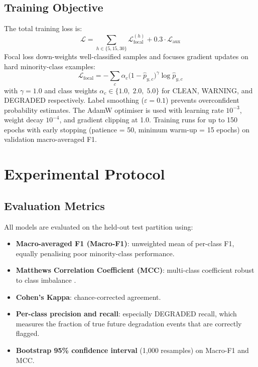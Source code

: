 \documentclass[pdflatex,sn-mathphys-num]{sn-jnl}
\begin{document}
\subsection{Training Objective}

The total training loss is:
\begin{equation}
  \mathcal{L} = \sum_{h \in \{5,15,30\}}
    \mathcal{L}_\text{focal}^{(h)} + 0.3 \cdot \mathcal{L}_\text{aux}
\end{equation}
Focal loss \cite{[AuthorYear_focal_loss_Lin2017]} down-weights
well-classified samples and focuses gradient updates on hard minority-class
examples:
\begin{equation}
  \mathcal{L}_\text{focal} = -\sum_c \alpha_c
    \bigl(1 - \hat{p}_{y,c}\bigr)^{\gamma}
    \log \hat{p}_{y,c}
\end{equation}
with $\gamma = 1.0$ and class weights $\alpha_c \in \{1.0,\; 2.0,\; 5.0\}$
for CLEAN, WARNING, and DEGRADED respectively.  Label smoothing
($\varepsilon = 0.1$) prevents overconfident probability estimates.
The AdamW optimiser \cite{[AuthorYear_Adam_Kingma2015]} is used with learning
rate $10^{-3}$, weight decay $10^{-4}$, and gradient clipping at 1.0.
Training runs for up to 150 epochs with early stopping (patience = 50,
minimum warm-up = 15 epochs) on validation macro-averaged F1.

\section{Experimental Protocol}\label{sec:experiments}

\subsection{Evaluation Metrics}

All models are evaluated on the held-out test partition using:
\begin{itemize}
  \item \textbf{Macro-averaged F1 (Macro-F1)}: unweighted mean of per-class
    F1, equally penalising poor minority-class performance.
  \item \textbf{Matthews Correlation Coefficient (MCC)}: multi-class
    coefficient robust to class imbalance \cite{[AuthorYear_MCC_Baldi2000]}.
  \item \textbf{Cohen's Kappa}: chance-corrected agreement.
  \item \textbf{Per-class precision and recall}: especially DEGRADED recall,
    which measures the fraction of true future degradation events that are
    correctly flagged.
  \item \textbf{Bootstrap 95\% confidence interval} (1,000 resamples) on
    Macro-F1 and MCC.
\end{itemize}
\end{document}
